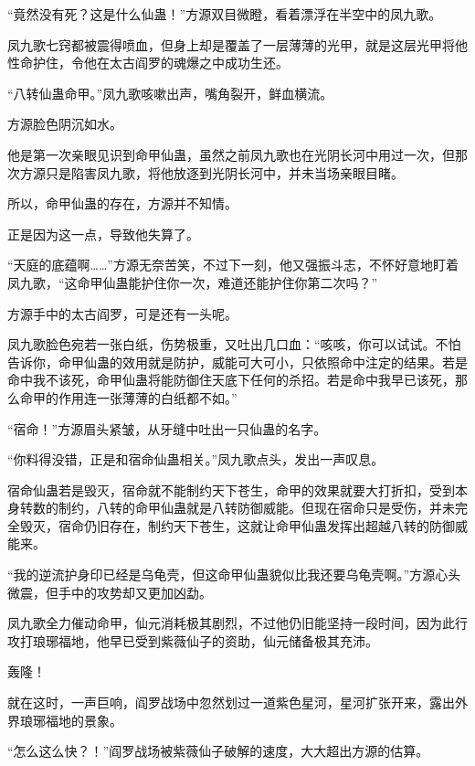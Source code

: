 
\begin{this_body}



“竟然没有死？这是什么仙蛊！”方源双目微瞪，看着漂浮在半空中的凤九歌。

凤九歌七窍都被震得喷血，但身上却是覆盖了一层薄薄的光甲，就是这层光甲将他性命护住，令他在太古阎罗的魂爆之中成功生还。

“八转仙蛊命甲。”凤九歌咳嗽出声，嘴角裂开，鲜血横流。

方源脸色阴沉如水。

他是第一次亲眼见识到命甲仙蛊，虽然之前凤九歌也在光阴长河中用过一次，但那次方源只是陷害凤九歌，将他放逐到光阴长河中，并未当场亲眼目睹。

所以，命甲仙蛊的存在，方源并不知情。

正是因为这一点，导致他失算了。

“天庭的底蕴啊……”方源无奈苦笑，不过下一刻，他又强振斗志，不怀好意地盯着凤九歌，“这命甲仙蛊能护住你一次，难道还能护住你第二次吗？”

方源手中的太古阎罗，可是还有一头呢。

凤九歌脸色宛若一张白纸，伤势极重，又吐出几口血：“咳咳，你可以试试。不怕告诉你，命甲仙蛊的效用就是防护，威能可大可小，只依照命中注定的结果。若是命中我不该死，命甲仙蛊将能防御住天底下任何的杀招。若是命中我早已该死，那么命甲的作用连一张薄薄的白纸都不如。”

“宿命！”方源眉头紧皱，从牙缝中吐出一只仙蛊的名字。

“你料得没错，正是和宿命仙蛊相关。”凤九歌点头，发出一声叹息。

宿命仙蛊若是毁灭，宿命就不能制约天下苍生，命甲的效果就要大打折扣，受到本身转数的制约，八转的命甲仙蛊就是八转防御威能。但现在宿命只是受伤，并未完全毁灭，宿命仍旧存在，制约天下苍生，这就让命甲仙蛊发挥出超越八转的防御威能来。

“我的逆流护身印已经是乌龟壳，但这命甲仙蛊貌似比我还要乌龟壳啊。”方源心头微震，但手中的攻势却又更加凶勐。

凤九歌全力催动命甲，仙元消耗极其剧烈，不过他仍旧能坚持一段时间，因为此行攻打琅琊福地，他早已受到紫薇仙子的资助，仙元储备极其充沛。

轰隆！

就在这时，一声巨响，阎罗战场中忽然划过一道紫色星河，星河扩张开来，露出外界琅琊福地的景象。

“怎么这么快？！”阎罗战场被紫薇仙子破解的速度，大大超出方源的估算。


\end{this_body}
